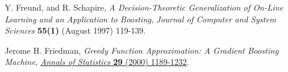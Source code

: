 \documentclass{JINST}
\theoremstyle{definition}
\theoremstyle{remark}
\begin{document}
\begin{thebibliography}{9}
{Y. Freund, and R. Schapire},
\emph{A Decision-Theoretic Generalization of On-Line Learning and an Application to Boosting}, 
{\emph{Journal of Computer and System Sciences} {\bf 55(1)} (August 1997) 119-139}.

{Jerome H. Friedman},
\emph{Greedy Function Approximation: A Gradient Boosting Machine},
\href{http://statweb.stanford.edu/~jhf/ftp/trebst.pdf}
{\emph{Annals of Statistics} {\bf 29} (2000) 1189-1232}.







\end{thebibliography}

\appendix

%
\end{document}

